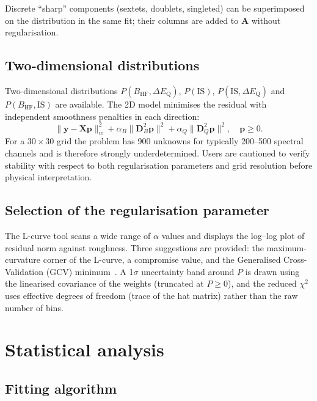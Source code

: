 \documentclass[smallcondensed]{svjour3}
\begin{document}
Discrete ``sharp'' components (sextets, doublets, singleted) can be
superimposed on the distribution in the same fit; their columns are added to
$\mathbf{A}$ without regularisation.

\subsection{Two-dimensional distributions}
\label{sec:2d}

Two-dimensional distributions $P(B_\mathrm{HF}, \Delta E_\mathrm{Q})$,
$P(\mathrm{IS})$, $P(\mathrm{IS}, \Delta E_\mathrm{Q})$ and
$P(B_\mathrm{HF}, \mathrm{IS})$ are available. The 2D model minimises the
residual with independent smoothness penalties in each direction:
\begin{equation}
  \|\mathbf{y} - \mathbf{X}\mathbf{p}\|_w^2
  + \alpha_B\|\mathbf{D}^2_B\mathbf{p}\|^2
  + \alpha_Q\|\mathbf{D}^2_Q\mathbf{p}\|^2,
  \quad \mathbf{p} \geq 0.
\end{equation}
For a $30\times30$ grid the problem has 900 unknowns for typically
200--500 spectral channels and is therefore strongly underdetermined.
Users are cautioned to verify stability with respect to both regularisation
parameters and grid resolution before physical interpretation.

\subsection{Selection of the regularisation parameter}
\label{sec:lcurve}

The L-curve tool scans a wide range of $\alpha$ values and displays the
log--log plot of residual norm against roughness. Three suggestions are
provided: the maximum-curvature corner of the L-curve, a compromise value,
and the Generalised Cross-Validation (GCV) minimum~\cite{hansen1992}. A 1$\sigma$
uncertainty band around $P$ is drawn using the linearised covariance of the
weights (truncated at $P \geq 0$), and the reduced $\chi^2$ uses effective
degrees of freedom (trace of the hat matrix) rather than the raw number of
bins.

\section{Statistical analysis}
\label{sec:statistics}

\subsection{Fitting algorithm}
\label{sec:fitalgo}
\end{document}
